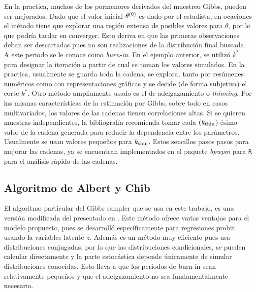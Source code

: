 \documentclass[../Main/Main.tex]{subfiles}
\begin{document}
En la practica, muchos de los pormenores derivados del muestreo Gibbs, pueden ser mejorados. Dado que el valor inicial $\theta^{(0)}$ es dado por el estadista, en ocaciones el método tiene que explorar una región extensa de posibles valores para $\theta$, por lo que podría tardar en converger. Esto deriva en que las primeras observaciones deban ser descartadas pues no son realizaciones de la distribución final buscada. A este periodo se le conoce como \textit{burn-in}. En el ejemplo anterior, se utilizó $k^*$ para designar la iteración a partir de cual se toman los valores simulados. En la practica, usualmente se guarda toda la cadena, se explora, tanto por resúmenes numéricos como con representaciones gráficas y se decide (de forma subjetiva) el corte  $k^*$. Otro método ampliamente usado es el de adelgazamiento o \textit{thinning}. Por las mismas características de la estimación por Gibbs, sobre todo en casos multivariados, los valores de las cadenas tienen correlaciones altas. Si se quieren muestras independientes, la bibliografía recomienda tomar cada $(k_{\text{thin}}$)-ésimo valor de la cadena generada para reducir la dependencia entre los parámetros. Usualmente se usan valores pequeños para $k_{\text{thin}}$.  Estos sencillos pasos pasos para mejorar las cadenas, ya se encuentran implementados en el paquete \textit{bpwpm} para \verb|R| para el análisis rápido de las cadenas.

\subsection{Algoritmo de Albert y Chib}
El algoritmo particular del Gibbs sampler que se usa en este trabajo, es una versión modificada del presentado en \citet{albert1993bayesian}. Este método ofrece varias ventajas para el modelo propuesto, pues se desarrolló específicamente para regresiones probit usando la variables latente $z$. Además es un método muy eficiente pues usa distribuciones conjugadas, por lo que las distribuciones condicionales, se pueden calcular directamente y la parte estocástica depende únicamente de simular distribuciones conocidas. Esto lleva a que los periodos de burn-in sean relativamente pequeños y que el adelgazamiento no sea fundamentalmente necesario.
\end{document}
